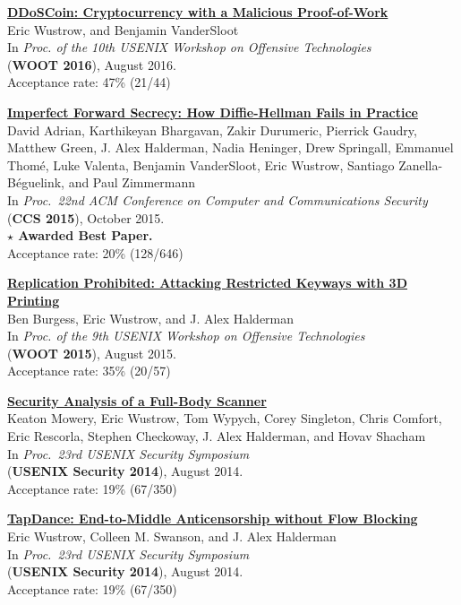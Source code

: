 \documentclass[margin,11pt]{res} %
\begin{document}
\newpage
    \textbf{\href{https://github.com/ewust/DDoSCoin}{DDoSCoin: Cryptocurrency with a Malicious Proof-of-Work}} \\
    Eric Wustrow, and Benjamin VanderSloot \\
    In \emph{Proc. of the 10th USENIX Workshop on Offensive Technologies} \\
    (\textbf{WOOT 2016}), August 2016. \\
    Acceptance rate: 47\% (21/44)

    \textbf{\href{https://weakdh.org/}{Imperfect Forward Secrecy: How Diffie-Hellman Fails in Practice}} \\
    David Adrian, Karthikeyan Bhargavan, Zakir Durumeric, Pierrick Gaudry, Matthew Green,
    J. Alex Halderman, Nadia Heninger, Drew Springall, Emmanuel Thom\'e, Luke Valenta,
    Benjamin VanderSloot, Eric Wustrow, Santiago Zanella-B\'eguelink, and Paul Zimmermann \\
    In \emph{Proc.\ 22nd ACM Conference on Computer and Communications Security} \\
    (\textbf{CCS 2015}), October 2015. \\
    \textbf{$\star$ Awarded Best Paper.} \\
    Acceptance rate: 20\% (128/646)

    \textbf{\href{https://keysforge.com/}{Replication Prohibited: Attacking Restricted Keyways with 3D Printing}} \\
    Ben Burgess, Eric Wustrow, and J. Alex Halderman \\
    In \emph{Proc. of the 9th USENIX Workshop on Offensive Technologies} \\
    (\textbf{WOOT 2015}), August 2015. \\
    Acceptance rate: 35\% (20/57)

    \textbf{\href{https://www.radsec.org/paper.html}{Security Analysis of a Full-Body Scanner}} \\
    Keaton Mowery, Eric Wustrow, Tom Wypych, Corey Singleton, Chris Comfort, Eric Rescorla, Stephen Checkoway, J. Alex Halderman, and Hovav Shacham \\
    In \emph{Proc.\ 23rd USENIX Security Symposium} \\
    (\textbf{USENIX Security 2014}), August 2014. \\
    Acceptance rate: 19\% (67/350)

    \textbf{\href{https://jhalderm.com/pub/papers/tapdance-sec14.pdf}{TapDance: End-to-Middle Anticensorship without Flow Blocking}} \\
    Eric Wustrow, Colleen M. Swanson, and J. Alex Halderman \\
    In \emph{Proc.\ 23rd USENIX Security Symposium} \\
    (\textbf{USENIX Security 2014}), August 2014. \\
    Acceptance rate: 19\% (67/350)
\end{document}
